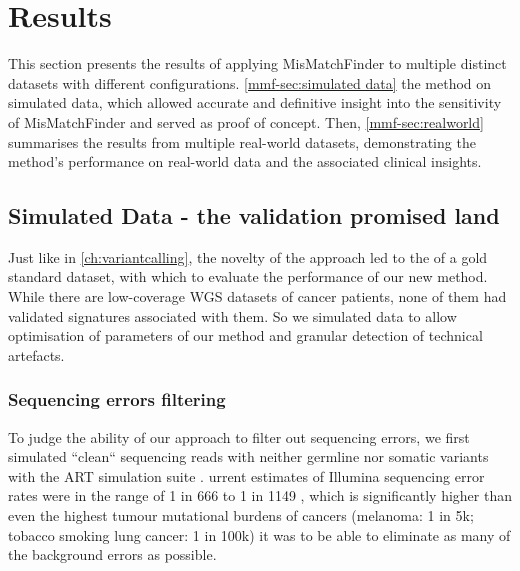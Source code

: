 
\section{Results}
\label{mmf-sec:results}
This section presents the results of applying MisMatchFinder to multiple distinct datasets with different configurations.  \autoref{mmf-sec:simulated data}  the method on simulated data, which allowed accurate and definitive insight into the sensitivity of MisMatchFinder and served as proof of concept. Then, \autoref{mmf-sec:realworld} summarises the results from multiple real-world datasets, demonstrating the method's performance on real-world data and the associated clinical insights.

\subsection{Simulated Data - the validation promised land}
\label{mmf-sec:simulated data}
Just like in \autoref{ch:variantcalling}, the novelty of the approach led to the of a gold standard dataset, with which to evaluate the performance of our new method. While there are low-coverage WGS datasets of cancer patients, none of them had validated signatures associated with them. So we simulated data to allow  optimisation of parameters of our method and granular detection of technical artefacts. 

\subsubsection{Sequencing errors filtering}
\label{mmf-sec:cleanSim}
To judge the ability of our approach to filter out sequencing errors, we first simulated ``clean`` sequencing reads with neither germline nor somatic variants with the ART simulation suite \cite{Huang2011}. urrent estimates of Illumina sequencing error rates were in the range of 1 in 666 to 1 in 1149 \cite{Stoler2021}, which is significantly higher than even the highest tumour mutational burdens of  cancers (melanoma: 1 in 5k; tobacco smoking lung cancer: 1 in 100k) it was  to be able to eliminate as many of the background errors as possible.

